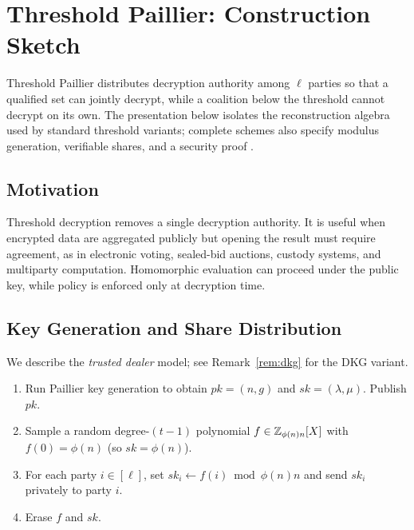 \section{Threshold Paillier: Construction Sketch}

Threshold Paillier distributes decryption authority among $\ell$ parties so that a qualified set can jointly decrypt, while a coalition below the threshold cannot decrypt on its own. The presentation below isolates the reconstruction algebra used by standard threshold variants; complete schemes also specify modulus generation, verifiable shares, and a security proof \cite{FouquePoupardStern2000,DamgardJurik2001}.

\subsection{Motivation}

Threshold decryption removes a single decryption authority. It is useful when encrypted data are aggregated publicly but opening the result must require agreement, as in electronic voting, sealed-bid auctions, custody systems, and multiparty computation. Homomorphic evaluation can proceed under the public key, while policy is enforced only at decryption time.

\subsection{Key Generation and Share Distribution}

We describe the \emph{trusted dealer} model; see Remark~\ref{rem:dkg} for the DKG variant.

\begin{enumerate}
  \item Run Paillier key generation to obtain $pk = (n, g)$ and $sk = (\lambda, \mu)$.
    Publish $pk$.
  \item Sample a random degree-$(t-1)$ polynomial $f \in \mathbb{Z}_{\phi(n)n}[X]$ with
    $f(0) = \phi(n)$ (so $sk = \phi(n)$).
  \item For each party $i \in [\ell]$, set $sk_i \gets f(i) \bmod \phi(n)n$ and send $sk_i$
    privately to party $i$.
  \item Erase $f$ and $sk$.
\end{enumerate}

